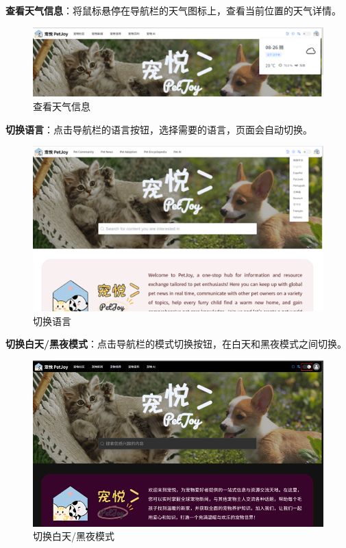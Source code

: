 \begin{itemize}
	\textbf{查看天气信息}：将鼠标悬停在导航栏的天气图标上，查看当前位置的天气详情。

	\begin{figure}[H]
		\centering
		\includegraphics[scale=0.8]{figures/TopNavigationBar3.png} 
		\caption{查看天气信息}
	\end{figure}

	\textbf{切换语言}：点击导航栏的语言按钮，选择需要的语言，页面会自动切换。

	\begin{figure}[H]
		\centering
		\includegraphics[scale=0.8]{figures/TopNavigationBar4.png} 
		\caption{切换语言}
	\end{figure}

	\textbf{切换白天/黑夜模式}：点击导航栏的模式切换按钮，在白天和黑夜模式之间切换。

	\begin{figure}[H]
		\centering
		\includegraphics[scale=0.8]{figures/TopNavigationBar5.png} 
		\caption{切换白天/黑夜模式}
	\end{figure}
	

\end{itemize}
